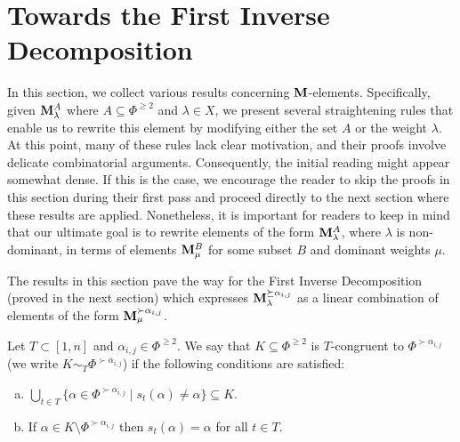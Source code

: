 

\section{Towards the First Inverse Decomposition}
\label{section identities to prove first inverse decomposition}

In this section, we collect various results concerning $\mathbf{M}$-elements. Specifically, given $\mathbf{M}_{\lambda}^A$ where $A \subseteq \Phi^{\geq 2}$ and $\lambda \in X$, we present several straightening rules that enable us to rewrite this element by modifying either the set $A$ or the weight $\lambda$. At this point, many of these rules lack clear motivation, and their proofs involve delicate combinatorial arguments. Consequently, the initial reading might appear somewhat dense. If this is the case, we encourage the reader to skip the proofs in this section during their first pass and proceed directly to the next section where these results are applied. Nonetheless, it is important for readers to keep in mind that our ultimate goal is to rewrite elements of the form $\mathbf{M}_{\lambda}^A$, where $\lambda$ is non-dominant, in terms of elements $\mathbf{M}_{\mu}^B$ for some subset $B$ and dominant weights $\mu$.

The results in this section pave the way for the First Inverse Decomposition (proved in the next section) which expresses $\mathbf{M}_{\lambda}^{\succeq \alpha_{i,j}}$ as a linear combination of elements of the form $\mathbf{M}_{\mu}^{\succ \alpha_{i,j}}$.



\begin{definition}\rm\label{def: locally greater than alpha} 
    Let $T\subset [1,n]$ and $\alpha_{i,j} \in \Phi^{\geq 2}$. We say that  $K\subseteq \Phi^{\geq 2}$ is $T$-congruent  to  $\Phi^{\succ\alpha_{i,j}}$ (we write $K\sim_{T} \Phi^{\succ\alpha_{i,j}}$) if the following conditions are satisfied:

    \begin{enumerate}[(a)]
        \item  \label{condition a in T-congruent}$\displaystyle\bigcup_{t\in T}  \{  \alpha \in \Phi^{\succ \alpha_{i,j}} \mid s_{t} (\alpha )\neq \alpha  \} \subseteq K $. 
        \item \label{condition b in T-congruent} If $\displaystyle\alpha\in K\setminus  \Phi^{\succ \alpha_{i,j}}$ then $s_{t}(\alpha)=\alpha$ for all $t\in T$. 
    \end{enumerate} 
\end{definition}

